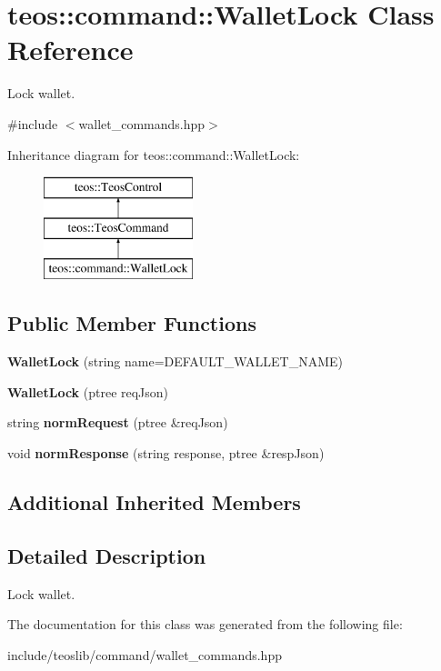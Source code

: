\hypertarget{classteos_1_1command_1_1_wallet_lock}{}\section{teos\+:\+:command\+:\+:Wallet\+Lock Class Reference}
\label{classteos_1_1command_1_1_wallet_lock}


Lock wallet.  




{\ttfamily \#include $<$wallet\+\_\+commands.\+hpp$>$}

Inheritance diagram for teos\+:\+:command\+:\+:Wallet\+Lock\+:\begin{figure}[H]
\begin{center}
\leavevmode
\includegraphics[height=3.000000cm]{classteos_1_1command_1_1_wallet_lock}
\end{center}
\end{figure}
\subsection*{Public Member Functions}
\begin{DoxyCompactItemize}
\item 
\mbox{\label{classteos_1_1command_1_1_wallet_lock_a5e80a3195774c7911d716ff4fa41a4e7}} 
{\bfseries Wallet\+Lock} (string name=D\+E\+F\+A\+U\+L\+T\+\_\+\+W\+A\+L\+L\+E\+T\+\_\+\+N\+A\+ME)
\item 
\mbox{\label{classteos_1_1command_1_1_wallet_lock_a37c8f6a1c32d651c2ef1f2aabfd9207d}} 
{\bfseries Wallet\+Lock} (ptree req\+Json)
\item 
\mbox{\label{classteos_1_1command_1_1_wallet_lock_aa2f7dbb10a35e4817467f2b4b95a0b95}} 
string {\bfseries norm\+Request} (ptree \&req\+Json)
\item 
\mbox{\label{classteos_1_1command_1_1_wallet_lock_afa87feb8243bc8ccdaf3438ba4817a9d}} 
void {\bfseries norm\+Response} (string response, ptree \&resp\+Json)
\end{DoxyCompactItemize}
\subsection*{Additional Inherited Members}


\subsection{Detailed Description}
Lock wallet. 

The documentation for this class was generated from the following file\+:\begin{DoxyCompactItemize}
\item 
include/teoslib/command/wallet\+\_\+commands.\+hpp\end{DoxyCompactItemize}
